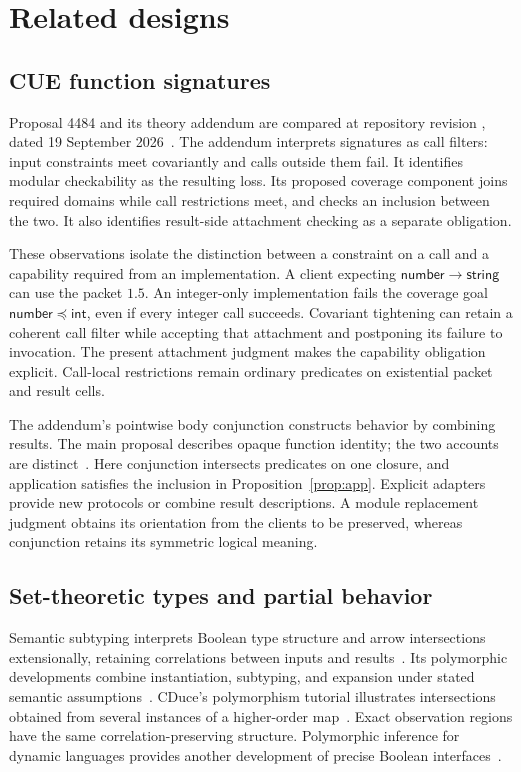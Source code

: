 \documentclass[10pt,a4paper]{article}
\newcommand{\code}[1]{\texttt{\detokenize{#1}}}
\newcommand{\Int}{\mathsf{int}}
\newcommand{\Num}{\mathsf{number}}
\newcommand{\Str}{\mathsf{string}}
\theoremstyle{remark}
\begin{document}
\section{Related designs}
\label{sec:related}

\subsection{CUE function signatures}
Proposal 4484 and its theory addendum are compared at repository revision
\code{a949162aedb8}, dated 19 September 2026~\cite{cueproposal,cueaddendum}.
The addendum interprets signatures as call filters: input constraints meet
covariantly and calls outside them fail. It identifies modular checkability as
the resulting loss. Its proposed coverage component joins required domains
while call restrictions meet, and checks an inclusion between the two. It also
identifies result-side attachment checking as a separate obligation.

These observations isolate the distinction between a constraint on a call and
a capability required from an implementation. A client expecting
$\Num\to\Str$ can use the packet $1.5$. An integer-only implementation fails
the coverage goal $\Num\preceq\Int$, even if every integer call succeeds.
Covariant tightening can retain a coherent call filter while accepting that
attachment and postponing its failure to invocation. The present attachment
judgment makes the capability obligation explicit. Call-local restrictions
remain ordinary predicates on existential packet and result cells.

The addendum's pointwise body conjunction constructs behavior by combining
results. The main proposal describes opaque function identity; the two accounts
are distinct~\cite{cueproposal,cueaddendum}. Here conjunction intersects
predicates on one closure, and application satisfies the inclusion in
Proposition~\ref{prop:app}. Explicit adapters provide new protocols or combine
result descriptions. A module replacement judgment obtains its orientation
from the clients to be preserved, whereas conjunction retains its symmetric
logical meaning.

\subsection{Set-theoretic types and partial behavior}
Semantic subtyping interprets Boolean type structure and arrow intersections
extensionally, retaining correlations between inputs and
results~\cite{semantic}. Its polymorphic developments combine instantiation,
subtyping, and expansion under stated semantic assumptions~\cite{castagnaxu,poly1,poly2}.
CDuce's polymorphism tutorial illustrates intersections obtained from several
instances of a higher-order map~\cite{cduce}. Exact observation regions have the
same correlation-preserving structure. Polymorphic inference for dynamic
languages provides another development of precise Boolean interfaces~\cite{dynamic}.
\end{document}
